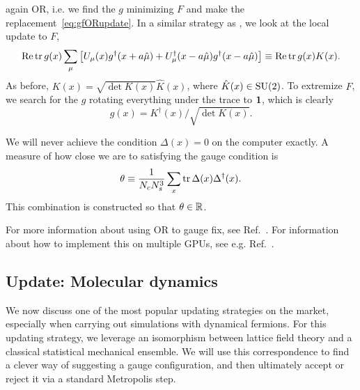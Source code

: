 again OR, i.e. we find the $g$ minimizing $F$ and make the
replacement~\eqref{eq:gfORupdate}. In a similar strategy as
, we look at the local update to $F$,
\begin{equation}
  \mathop{\mathrm{Re}}\tr g(x)\sum_\mu\left[U_\mu(x)g^\dagger(x+a\hat\mu)
                        +U_\mu^\dagger(x-a\hat\mu)g^\dagger(x-a\hat\mu)\right]
  \equiv\mathop{\mathrm{Re}}\tr g(x)K(x).
\end{equation}
As before, $K(x)=\sqrt{\det K(x)}\hat K(x)$, where $\hat K(x)\in\operatorname{SU}(2)$.
To extremize $F$, we search for the $g$ rotating everything under the
trace to ${\mathbf 1}$, which is clearly
\begin{equation}
  g(x)=K^\dagger(x)/\sqrt{\det K(x)}.
\end{equation} 

We will never achieve the condition $\Delta(x)=0$ on the computer exactly.
A measure of how close we are to satisfying the gauge condition is
\begin{equation}
  \theta\equiv\frac{1}{N_c N_s^3}\sum_x\tr\Delta(x)\Delta^\dagger(x).
\end{equation}
This combination is constructed so that $\theta\in\mathbb{R}$. 

For more information
about using OR to gauge fix, see Ref.~\cite{mandula_efficient_1990}. 
For information about how to implement this on multiple GPUs, see
e.g. Ref.~\cite{schrock_coulomb_2013}.

\subsection{Update: Molecular dynamics}\label{sec:MD}

We now discuss one of the most popular updating strategies on the market,
especially when carrying out simulations with dynamical fermions.
For this updating strategy, we leverage an isomorphism between
lattice field theory and a classical statistical mechanical 
ensemble. We will use this
correspondence to find a clever way of suggesting a gauge
configuration, and then ultimately accept or reject it via
a standard Metropolis step.

